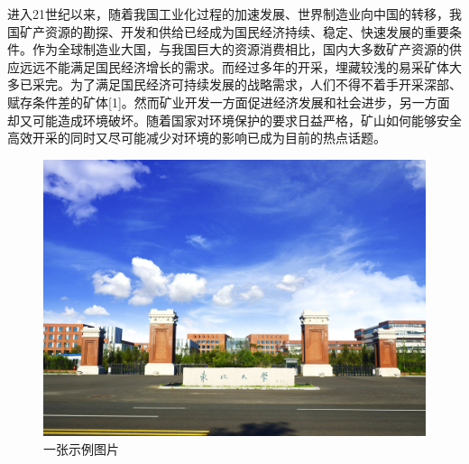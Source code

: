 \xiaosi

进入21世纪以来，随着我国工业化过程的加速发展、世界制造业向中国的转移，我国矿产资源的勘探、开发和供给已经成为国民经济持续、稳定、快速发展的重要条件。作为全球制造业大国，与我国巨大的资源消费相比，国内大多数矿产资源的供应远远不能满足国民经济增长的需求。而经过多年的开采，埋藏较浅的易采矿体大多已采完。为了满足国民经济可持续发展的战略需求，人们不得不着手开采深部、赋存条件差的矿体[1]。然而矿业开发一方面促进经济发展和社会进步，另一方面却又可能造成环境破坏。随着国家对环境保护的要求日益严格，矿山如何能够安全高效开采的同时又尽可能减少对环境的影响已成为目前的热点话题。\citep{agrawal2011challenges}\cite{wu2013data}\cite{zhang2016}

\begin{figure}[H]
    \centering
    \includegraphics[width=0.8\linewidth]{img/fig1.jpg}
    \caption{一张示例图片}
    \label{fig:figure1}
\end{figure}



